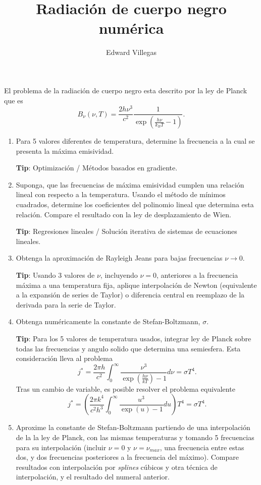 \documentclass[10pt,letterpaper]{article}
\author{Edward Villegas}
\title{Radiación de cuerpo negro numérica}
\begin{document}
El problema de la radiación de cuerpo negro esta descrito por la ley de Planck que es
\begin{equation}
B_\nu(\nu, T) = \frac{2h\nu^3}{c^2}\frac{1}{\exp\left(\frac{h\nu}{k_BT} -1\right)}. \label{eq:planck_v}
\end{equation}
\begin{enumerate}
\item Para 5 valores diferentes de temperatura, determine la frecuencia a la cual se presenta la máxima emisividad.

\textbf{Tip}: Optimización / Métodos basados en gradiente.

\item Suponga, que las frecuencias de máxima emisividad cumplen una relación lineal con respecto a la temperatura. Usando el método de mínimos cuadrados, determine los coeficientes del polinomio lineal que determina esta relación. Compare el resultado con la ley de desplazamiento de Wien.

\textbf{Tip}: Regresiones lineales / Solución iterativa de sistemas de ecuaciones lineales.

\item Obtenga la aproximación de Rayleigh Jeans para bajas frecuencias $\nu \rightarrow 0$.

\textbf{Tip}: Usando 3 valores de $\nu$, incluyendo $\nu=0$, anteriores a la frecuencia máxima a una temperatura fija, aplique interpolación de Newton (equivalente a la expansión de series de Taylor) o diferencia central en reemplazo de la derivada para la serie de Taylor.

\item Obtenga numéricamente la constante de Stefan-Boltzmann, $\sigma$. 

\textbf{Tip}: Para los 5 valores de temperatura usados, integrar ley de Planck sobre todas las frecuencias y angulo solido que determina una semiesfera. Esta consideración lleva al problema
$$ j^* = \frac{2 \pi h}{c^2} \int_0^\infty \frac{\nu^3}{\exp\left(\frac{h\nu}{kT} \right)-1} d\nu = \sigma T^4. $$
Tras un cambio de variable, es posible resolver el problema equivalente
$$ j^* = \left(\frac{2 \pi k^4}{c^2 h^3} \int_0^\infty \frac{u^3}{\exp(u)-1} du \right) T^4 = \sigma T^4. $$

\item Aproxime la constante de Stefan-Boltzmann partiendo de una interpolación de la la ley de Planck, con las mismas temperaturas y tomando 5 frecuencias para su interpolación (incluir $\nu=0$ y $\nu = \nu_{max}$, una frecuencia entre estas dos, y dos frecuencias posteriores a la frecuencia del máximo). Compare resultados con interpolación por \textit{splines} cúbicos y otra técnica de interpolación, y el resultado del numeral anterior.
\end{enumerate}
\end{document}
